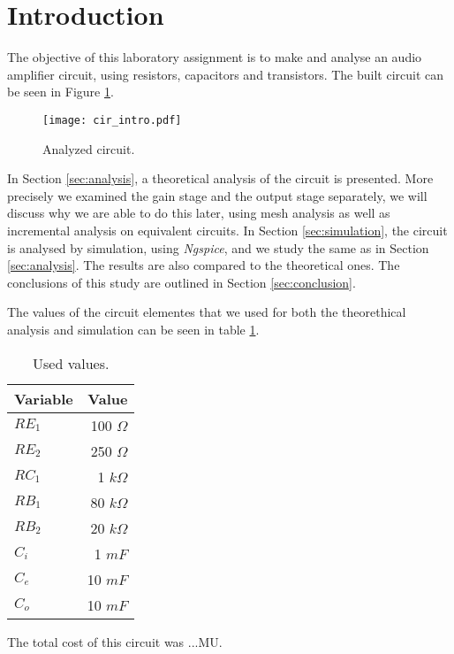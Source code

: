 \section{Introduction}
\label{sec:introduction}

The objective of this laboratory assignment is to make and analyse an audio amplifier circuit, using resistors, capacitors and transistors. The built circuit can be seen in Figure \ref{fig:cir_intro}.

\begin{figure}[H] \centering
\texttt{[image: cir\_intro.pdf]}
\caption{Analyzed circuit.}
\label{fig:cir_intro}
\end{figure}

In Section \ref{sec:analysis}, a theoretical analysis of the circuit is
presented. More precisely we examined the gain stage and the output stage separately, we will discuss why we are able to do this later, using mesh analysis as well as incremental analysis on equivalent circuits.
In Section \ref{sec:simulation}, the circuit is analysed by simulation, using \textit{Ngspice}, and we study the same as in Section \ref{sec:analysis}. The results are also compared to the theoretical ones. The conclusions of this study are outlined in Section \ref{sec:conclusion}.
\par
The values of the circuit elementes that we used for both the theorethical analysis and simulation can be seen in table \ref{tab:intro_values}.

\begin{table}[H]
  \centering
  \begin{tabular}{|l|r|}
    \hline
        {\bf Variable} & {\bf Value} \\ \hline
        $RE_1$ & 100 $\Omega$ \\ \hline
        $RE_2$ & 250 $\Omega$ \\ \hline
        $RC_1$ & 1 $k\Omega$ \\ \hline
        $RB_1$ & 80 $k\Omega$ \\ \hline
        $RB_2$ & 20 $k\Omega$ \\ \hline
        $C_i$ & 1 $mF$ \\ \hline
        $C_e$ & 10 $mF$ \\ \hline
        $C_o$ & 10 $mF$ \\ \hline
  \end{tabular}
  \caption{Used values.}
  \label{tab:intro_values}
\end{table}

The total cost of this circuit was ...MU.
